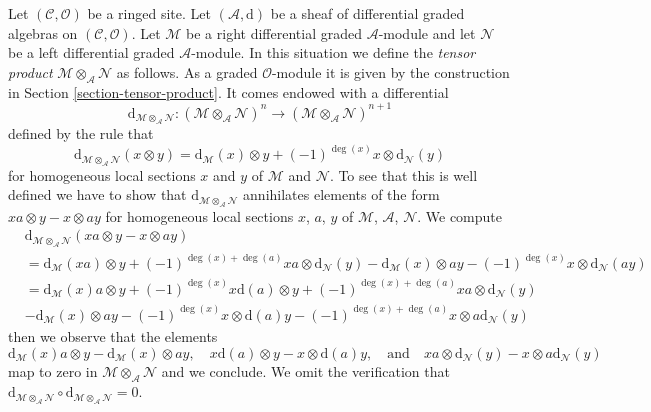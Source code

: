 \medskip\noindent
Let $(\mathcal{C}, \mathcal{O})$ be a ringed site. Let
$(\mathcal{A}, \text{d})$
be a sheaf of differential graded algebras on $(\mathcal{C}, \mathcal{O})$.
Let $\mathcal{M}$ be a right differential graded $\mathcal{A}$-module
and let $\mathcal{N}$ be a left differential graded $\mathcal{A}$-module.
In this situation we define the {\it tensor product}
$\mathcal{M} \otimes_\mathcal{A} \mathcal{N}$ as follows.
As a graded $\mathcal{O}$-module it is given by the construction
in Section \ref{section-tensor-product}. It comes endowed
with a differential
$$
\text{d}_{\mathcal{M} \otimes_\mathcal{A} \mathcal{N}} :
(\mathcal{M} \otimes_\mathcal{A} \mathcal{N})^n
\longrightarrow
(\mathcal{M} \otimes_\mathcal{A} \mathcal{N})^{n + 1}
$$
defined by the rule that
$$
\text{d}_{\mathcal{M} \otimes_\mathcal{A} \mathcal{N}}(x \otimes y) =
\text{d}_\mathcal{M}(x) \otimes y +
(-1)^{\deg(x)}x \otimes \text{d}_\mathcal{N}(y)
$$
for homogeneous local sections $x$ and $y$ of $\mathcal{M}$ and $\mathcal{N}$.
To see that this is well defined we have to show that
$\text{d}_{\mathcal{M} \otimes_\mathcal{A} \mathcal{N}}$ annihilates
elements of the form $xa \otimes y - x \otimes ay$ for homogeneous
local sections $x$, $a$, $y$ of $\mathcal{M}$, $\mathcal{A}$, $\mathcal{N}$.
We compute
\begin{align*}
&
\text{d}_{\mathcal{M} \otimes_\mathcal{A} \mathcal{N}}(
xa \otimes y - x \otimes ay) \\
& =
\text{d}_\mathcal{M}(xa) \otimes y + (-1)^{\deg(x) + \deg(a)}
xa \otimes \text{d}_\mathcal{N}(y)
-\text{d}_\mathcal{M}(x) \otimes ay - (-1)^{\deg(x)}
x \otimes \text{d}_\mathcal{N}(ay) \\
& =
\text{d}_\mathcal{M}(x)a \otimes y + (-1)^{\deg(x)}x\text{d}(a) \otimes y
+ (-1)^{\deg(x) + \deg(a)} xa \otimes \text{d}_\mathcal{N}(y) \\
&
-\text{d}_\mathcal{M}(x) \otimes ay - (-1)^{\deg(x)}
x \otimes \text{d}(a)y - (-1)^{\deg(x) +
\deg(a)} x\otimes a\text{d}_\mathcal{N}(y)
\end{align*}
then we observe that the elements
$$
\text{d}_\mathcal{M}(x)a \otimes y - \text{d}_\mathcal{M}(x) \otimes ay,\quad
x\text{d}(a) \otimes y - x \otimes \text{d}(a)y,\quad
\text{and}\quad
xa \otimes \text{d}_\mathcal{N}(y) - x\otimes a\text{d}_\mathcal{N}(y)
$$
map to zero in $\mathcal{M} \otimes_\mathcal{A} \mathcal{N}$
and we conclude. We omit the verification that
$\text{d}_{\mathcal{M} \otimes_\mathcal{A} \mathcal{N}} \circ
\text{d}_{\mathcal{M} \otimes_\mathcal{A} \mathcal{N}} = 0$.

